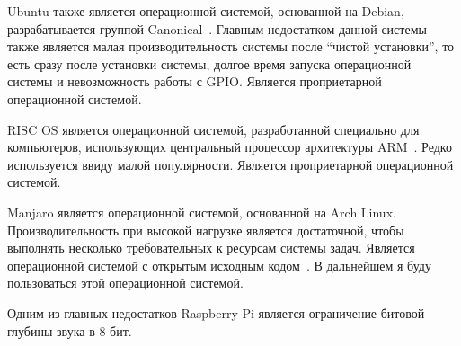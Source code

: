 Ubuntu также является операционной системой, основанной на Debian, разрабатывается группой Canonical~\cite{ubuntu}. Главным недостатком данной системы также является малая производительность системы после ``чистой установки'', то есть сразу после установки системы,  долгое время запуска операционной системы и невозможность работы с GPIO. Является проприетарной операционной системой.

RISC OS является операционной системой, разработанной специально для компьютеров, использующих центральный процессор архитектуры ARM~\cite{risc-os}. Редко используется ввиду малой популярности. Является проприетарной операционной системой.

Manjaro является операционной системой, основанной на Arch Linux. Производительность при высокой нагрузке является достаточной, чтобы выполнять несколько требовательных к ресурсам системы задач. Является операционной системой с открытым исходным кодом~\cite{manjaro}. В дальнейшем я буду пользоваться этой операционной системой.

Одним из главных недостатков Raspberry Pi является ограничение битовой глубины звука в 8 бит.
